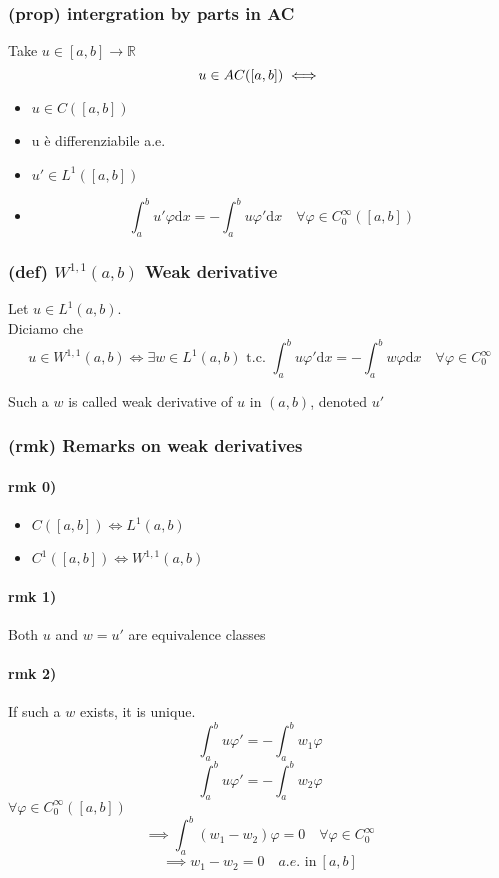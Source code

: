 \subsubsection{(prop) intergration by parts in AC}
Take $u\in [a,b]\to \mathbb R$\\
$$u\in AC([a,b])\\\iff$$
\begin{itemize}
    \item $u \in C([a,b])$
    \item u è differenziabile a.e.
    \item $u'\in L^1([a,b])$
    \item $$\int_a^b u'\varphi \mathrm d x = -\int_a^b u\varphi'\mathrm d x\quad \forall \varphi \in C_0^\infty([a,b])$$
\end{itemize}

\subsubsection{(def) $W^{1,1}(a,b)$ Weak derivative}
Let $u\in L^1(a,b)$. \\
Diciamo che $$u \in W^{1,1}(a,b) \iff \exists w\in L^1(a,b) \text{ t.c. } \int_a^b u\varphi '\mathrm dx=-\int_a^b w\varphi \mathrm d x \quad \forall \varphi \in C_0^\infty $$

Such a $w$ is called weak derivative of $u$ in $(a,b)$, denoted $u'$
\subsubsection{(rmk) Remarks on weak derivatives}
\paragraph{rmk 0)}
\begin{itemize}
    \item $C([a,b])\iff L^1(a,b)$
    \item $C^1([a,b])\iff W^{1,1}(a,b)$
\end{itemize}
\paragraph{rmk 1)}
Both $u$ and $w=u'$ are equivalence classes
\paragraph{rmk 2)}
If such a $w$ exists, it is unique.
$$\int_a^b u \varphi ' = -\int_a^b w_1\varphi $$
$$\int_a^b u \varphi ' = -\int_a^b w_2\varphi $$
$\forall \varphi \in C_0^\infty ([a,b])$
$$\implies\int_a^b(w_1-w_2)\varphi =0\quad \forall \varphi \in C_0^\infty$$
$$\implies w_1-w_2=0\quad a.e. \text{ in} \ [a,b]$$
